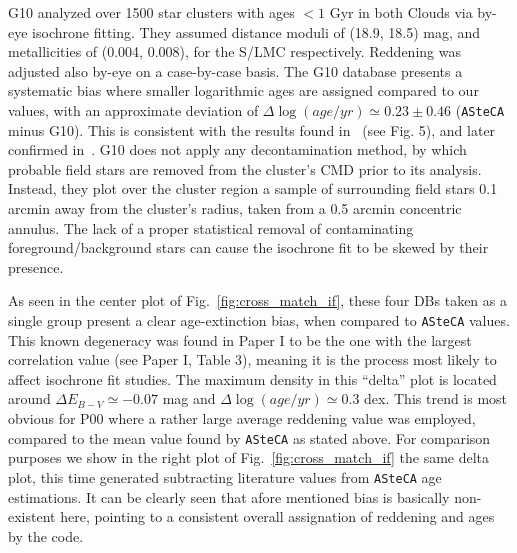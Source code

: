 \documentclass[draft]{aa}
\begin{document}
G10 analyzed over 1500 star clusters with ages ${<}1$ Gyr in both Clouds via
by-eye isochrone fitting. They assumed distance moduli of (18.9, 18.5) mag, and
metallicities of (0.004, 0.008), for the S/LMC respectively. Reddening was
adjusted also by-eye on a case-by-case basis.
The G10 database presents a systematic bias where smaller logarithmic ages are
assigned compared to our values, with an approximate deviation of $\Delta
\log(age/yr){\simeq}0.23\pm0.46$ (\texttt{ASteCA} minus G10). This is consistent
with the results found in~\cite{Choudhury_2015} (see Fig. 5), and later
confirmed in~\cite{Piatti_2015a,Piatti_2015b}.
%
G10 does not apply any decontamination method, by which probable field stars are
removed from the cluster's CMD prior to its analysis. Instead, they plot over
the cluster region a sample of surrounding field stars 0.1 arcmin away from the
cluster's radius, taken from a 0.5 arcmin concentric annulus. The lack of a
proper statistical removal of contaminating foreground/background stars can
cause the isochrone fit to be skewed by their presence.

%
As seen in the center plot of Fig.~\ref{fig:cross_match_if}, these four DBs
taken as a single group present a clear age-extinction bias, when compared
to \texttt{ASteCA} values. This known degeneracy was found in Paper I to be
the one with the largest correlation value (see Paper I, Table 3), meaning it is
the process most likely to affect isochrone fit studies.
The maximum density in this ``delta'' plot is located around
$\Delta E_{B-V}{\simeq-}0.07$ mag and $\Delta \log(age/yr){\simeq}0.3$ dex.
This trend is most obvious for P00 where a rather large average reddening
value was employed, compared to the mean value found by \texttt{ASteCA} as
stated above.
%
For comparison purposes we show in the right plot of
Fig.~\ref{fig:cross_match_if} the same delta plot, this time generated
subtracting literature values from \texttt{ASteCA} age estimations. It can 
be clearly seen that afore mentioned bias is basically non-existent here,
pointing to a consistent overall assignation of reddening and ages by
the code.
\end{document}
